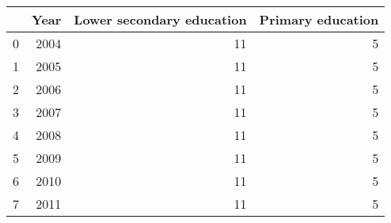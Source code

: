 \begin{tabular}{lrrr}
\toprule
 & Year & Lower secondary education & Primary education \\
\midrule
0 & 2004 & 11 & 5 \\
1 & 2005 & 11 & 5 \\
2 & 2006 & 11 & 5 \\
3 & 2007 & 11 & 5 \\
4 & 2008 & 11 & 5 \\
5 & 2009 & 11 & 5 \\
6 & 2010 & 11 & 5 \\
7 & 2011 & 11 & 5 \\
\bottomrule
\end{tabular}
